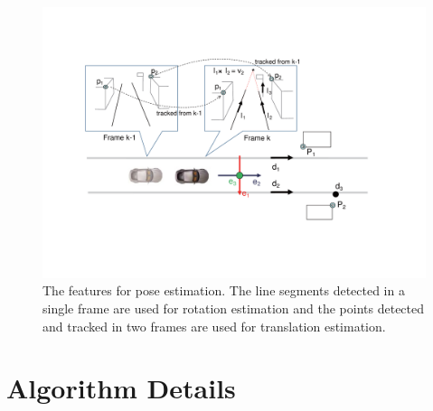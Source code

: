 \documentclass[letterpaper, 10 pt, conference]{ieeeconf}  %
\begin{document}
\begin{figure}
  \centering
  \includegraphics[width=0.9\linewidth]{source//Final//feature.pdf}
  \caption{The features for pose estimation. The line segments detected in a single frame are used for rotation estimation and the points detected and tracked in two frames are used for translation estimation.}
  \label{fig:features_for_estimation}
\end{figure}


\section{Algorithm Details}
\label{sec_details}

\end{document}
